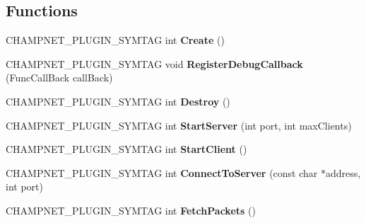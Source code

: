 \subsection*{Functions}
\begin{DoxyCompactItemize}
\item 
\hypertarget{namespace_champ_net_plugin_a849f82c5f4de7d9a7cf5d56644a5ebf2}{C\-H\-A\-M\-P\-N\-E\-T\-\_\-\-P\-L\-U\-G\-I\-N\-\_\-\-S\-Y\-M\-T\-A\-G int {\bfseries Create} ()}\label{namespace_champ_net_plugin_a849f82c5f4de7d9a7cf5d56644a5ebf2}

\item 
\hypertarget{namespace_champ_net_plugin_a5a62b238f68c59b131074192f76a332f}{C\-H\-A\-M\-P\-N\-E\-T\-\_\-\-P\-L\-U\-G\-I\-N\-\_\-\-S\-Y\-M\-T\-A\-G void {\bfseries Register\-Debug\-Callback} (Func\-Call\-Back call\-Back)}\label{namespace_champ_net_plugin_a5a62b238f68c59b131074192f76a332f}

\item 
\hypertarget{namespace_champ_net_plugin_a7380724b368807f88b5cbe3037a8a9d8}{C\-H\-A\-M\-P\-N\-E\-T\-\_\-\-P\-L\-U\-G\-I\-N\-\_\-\-S\-Y\-M\-T\-A\-G int {\bfseries Destroy} ()}\label{namespace_champ_net_plugin_a7380724b368807f88b5cbe3037a8a9d8}

\item 
\hypertarget{namespace_champ_net_plugin_a53b12084325aeaf2abd475f3b5d19627}{C\-H\-A\-M\-P\-N\-E\-T\-\_\-\-P\-L\-U\-G\-I\-N\-\_\-\-S\-Y\-M\-T\-A\-G int {\bfseries Start\-Server} (int port, int max\-Clients)}\label{namespace_champ_net_plugin_a53b12084325aeaf2abd475f3b5d19627}

\item 
\hypertarget{namespace_champ_net_plugin_ab92621bbf98ccf055d3a884220d5577e}{C\-H\-A\-M\-P\-N\-E\-T\-\_\-\-P\-L\-U\-G\-I\-N\-\_\-\-S\-Y\-M\-T\-A\-G int {\bfseries Start\-Client} ()}\label{namespace_champ_net_plugin_ab92621bbf98ccf055d3a884220d5577e}

\item 
\hypertarget{namespace_champ_net_plugin_ae65d85077ea14169471c94ef9412db81}{C\-H\-A\-M\-P\-N\-E\-T\-\_\-\-P\-L\-U\-G\-I\-N\-\_\-\-S\-Y\-M\-T\-A\-G int {\bfseries Connect\-To\-Server} (const char $\ast$address, int port)}\label{namespace_champ_net_plugin_ae65d85077ea14169471c94ef9412db81}

\item 
\hypertarget{namespace_champ_net_plugin_a6fb34db2c53b323bf7c1ff054de6b5f5}{C\-H\-A\-M\-P\-N\-E\-T\-\_\-\-P\-L\-U\-G\-I\-N\-\_\-\-S\-Y\-M\-T\-A\-G int {\bfseries Fetch\-Packets} ()}\label{namespace_champ_net_plugin_a6fb34db2c53b323bf7c1ff054de6b5f5}


\end{DoxyCompactItemize}
